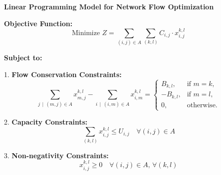 \documentclass{article}
\begin{document}
\textbf{Linear Programming Model for Network Flow Optimization}

\textbf{Objective Function:}
\[
\text{Minimize } Z = \sum_{(i,j) \in A} \sum_{(k,l)} C_{i,j} \cdot x_{i,j}^{k,l}
\]

\textbf{Subject to:}

1. \textbf{Flow Conservation Constraints:}
\[
\sum_{j \, \mid \, (m, j) \in A} x_{m,j}^{k,l} - \sum_{i \, \mid \, (i, m) \in A} x_{i,m}^{k,l} = \begin{cases} 
B_{k,l}, & \text{if } m = k, \\
-B_{k,l}, & \text{if } m = l, \\
0, & \text{otherwise}.
\end{cases}
\]

2. \textbf{Capacity Constraints:}
\[
\sum_{(k,l)} x_{i,j}^{k,l} \leq U_{i,j} \quad \forall (i,j) \in A
\]

3. \textbf{Non-negativity Constraints:}
\[
x_{i,j}^{k,l} \geq 0 \quad \forall (i,j) \in A, \, \forall (k,l)
\]
\end{document}
